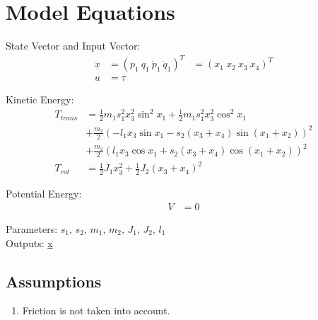 \documentclass[10pt,a4paper]{article}
\begin{document}
	
	\section{Model Equations} %
	
	State Vector and Input Vector:
	\begin{align*}
		\underline{x} &= (p_1 \ q_1 \ \dot{p}_1 \ \dot{q}_1)^T &= (x_1 \ x_2 \ x_3 \ x_4)^T \\
		u &= \tau 
	\end{align*}
	
	\noindent Kinetic Energy:			
	\begin{subequations}
	\begin{align*}
		T_{trans} &= \frac{1}{2} m_1s_1^2x_3^2 \sin^2 x_1+ \frac{1}{2} m_1s_1^2x_3^2 \cos^2 x_1 \\
		&+ \frac{m_2}{2}(-l_1x_3 \sin x_1 - s_2(x_3 + x_4) \sin(x_1 + x_2))^2 \\
		&+ \frac{m_2}{2}(l_1x_3 \cos x_1 + s_2(x_3 + x_4) \cos(x_1 + x_2))^2 \\
		T_{rot} &= \frac{1}{2} J_1x_3^2 + \frac{1}{2} J_2(x_3 + x_4)^2	
	\end{align*}
	\end{subequations}
		
	
	\noindent Potential Energy:			
	\begin{subequations}
	\begin{align*}
		V &= 0
	\end{align*}
	\end{subequations}

	\noindent
	Parameters: $s_1, \, s_2, \, m_1, \, m_2, \, J_1, \, J_2, \, l_1$ %
	\\
	Outputs: \underline{x} %
	
	
	\subsection{Assumptions} %
		\begin{enumerate} %
			\item Friction is not taken into account. 
		\end{enumerate}
	
\end{document}
